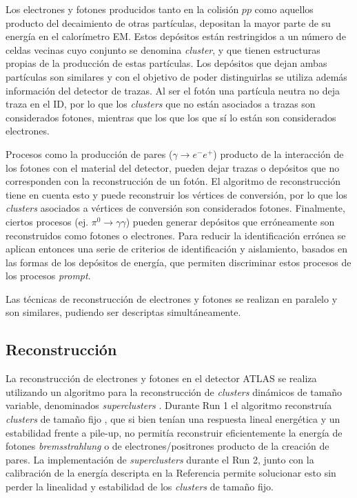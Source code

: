 
Los electrones y fotones producidos tanto en la colisión $pp$ como aquellos producto del decaimiento de otras partículas, depositan la mayor parte de su energía en el calorímetro EM. Estos depósitos están restringidos a un número de celdas vecinas cuyo conjunto se denomina \textit{cluster}, y que tienen estructuras propias de la producción de estas partículas. Los depósitos que dejan ambas partículas son similares y con el objetivo de poder distinguirlas se utiliza además información del detector de trazas. Al ser el fotón una partícula neutra no deja traza en el ID, por lo que los \textit{clusters} que no están asociados a trazas son considerados fotones, mientras que los que los que sí lo están son considerados electrones. 

Procesos como la producción de pares ($\gamma\to e^{-}e^{+}$) producto de la interacción de los fotones con el material del detector, pueden dejar trazas o depósitos que no corresponden con la reconstrucción de un fotón. El algoritmo de reconstrucción tiene en cuenta esto y puede reconstruir los vértices de conversión, por lo que los \textit{clusters} asociados a vértices de conversión son considerados fotones. Finalmente, ciertos procesos (ej. $\pi^{0}\to\gamma\gamma$) pueden generar depósitos que erróneamente son reconstruidos como fotones o electrones. Para reducir la identificación errónea se aplican entonces una serie de criterios de identificación y aislamiento, basados en las formas de los depósitos de energía, que permiten discriminar estos procesos de los procesos \textit{prompt}. 

Las técnicas de reconstrucción de electrones y fotones se realizan en paralelo y son similares, pudiendo ser
descriptas simultáneamente.

\subsection{Reconstrucción}


La reconstrucción de electrones y fotones en el detector ATLAS se realiza utilizando un algoritmo para la reconstrucción de \textit{clusters} dinámicos de tamaño variable, denominados \textit{superclusters} \cite{EGAM-2018-01}. Durante Run 1 el algoritmo reconstruía \textit{clusters} de tamaño fijo \cite{PERF-2013-04, PERF-2013-05, Lampl:1099735}, que si bien tenían una respuesta lineal energética y un estabilidad frente a pile-up, no permitía reconstruir eficientemente la energía de fotones \textit{bremsstrahlung} o de electrones/positrones producto de la creación de pares. La implementación de \textit{superclusters} durante el Run 2, junto con la calibración de la energía descripta en la Referencia \cite{PERF-2017-03} permite solucionar esto sin perder la linealidad y estabilidad de los \textit{clusters} de tamaño fijo.

